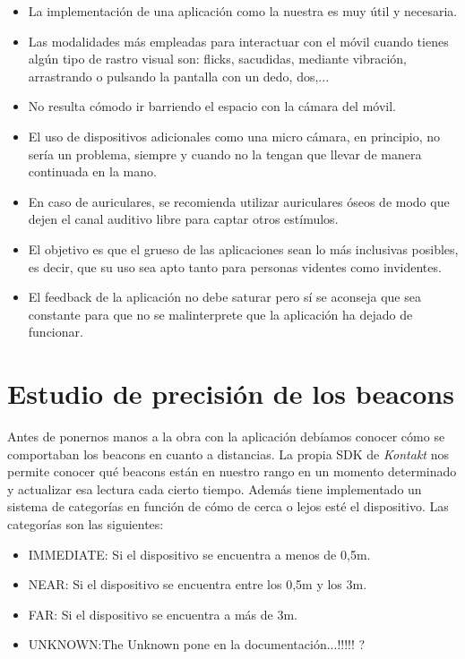 \begin{itemize}
	\item La implementación de una aplicación como la nuestra es muy útil y necesaria.
	\item Las modalidades más empleadas para interactuar con el móvil cuando tienes algún tipo de rastro visual son: flicks, sacudidas, mediante vibración, arrastrando o pulsando la pantalla con un dedo, dos,...
	\item No resulta cómodo ir barriendo el espacio con la cámara del móvil.
	\item El uso de dispositivos adicionales como una micro cámara, en principio, no sería un problema, siempre y cuando no la tengan que llevar de manera continuada en la mano.
	\item En caso de auriculares, se recomienda utilizar auriculares óseos de modo que dejen el canal auditivo libre para captar otros estímulos.
	\item El objetivo es que el grueso de las aplicaciones sean lo más inclusivas posibles, es decir, que su uso sea apto tanto para personas videntes como invidentes.
	\item El feedback de la aplicación no debe saturar pero sí se aconseja que sea constante para que no se malinterprete que la aplicación ha dejado de funcionar.
\end{itemize}


\section{Estudio de precisión de los beacons}

Antes de ponernos manos a la obra con la aplicación debíamos conocer cómo se comportaban los beacons en cuanto a distancias. La propia SDK de \textit{Kontakt} nos permite conocer qué beacons están en nuestro rango en un momento determinado y actualizar esa lectura cada cierto tiempo. Además tiene implementado un sistema de categorías en función de cómo de cerca o lejos esté el dispositivo. Las categorías son las siguientes:

\begin{itemize}
	\item IMMEDIATE: Si el dispositivo se encuentra a menos de 0,5m.
	\item NEAR: Si el dispositivo se encuentra entre los 0,5m y los 3m.
	\item FAR: Si el dispositivo se encuentra a más de 3m.
	\item UNKNOWN:The Unknown pone en la documentación...!!!!! ?
\end{itemize}


